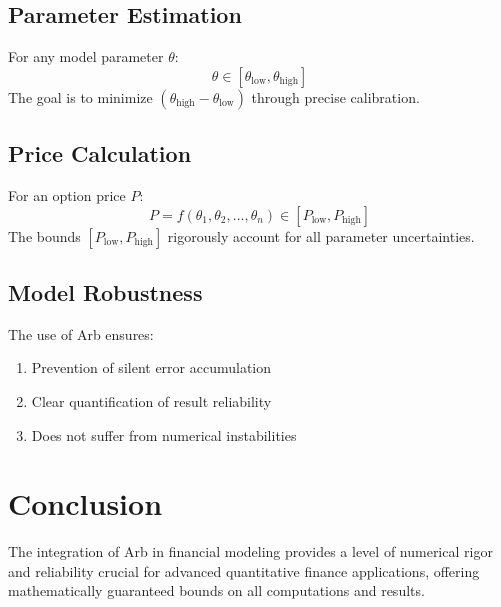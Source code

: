 \documentclass{article}
\newcommand{\tmop}[1]{\ensuremath{\operatorname{#1}}}
\begin{document}
\subsection{Parameter Estimation}

For any model parameter $\theta$:
\[ \theta \in [\theta_{\tmop{low}}, \theta_{\tmop{high}}] \]
The goal is to minimize $(\theta_{\tmop{high}} - \theta_{\tmop{low}})$ through
precise calibration.

\subsection{Price Calculation}

For an option price $P$:
\[ P = f (\theta_1, \theta_2, ..., \theta_n) \in [P_{\tmop{low}},
   P_{\tmop{high}}] \]
The bounds $[P_{\tmop{low}}, P_{\tmop{high}}]$ rigorously account for all
parameter uncertainties.

\subsection{Model Robustness}

The use of Arb ensures:
\begin{enumerate}
  \item Prevention of silent error accumulation
  
  \item Clear quantification of result reliability
  
  \item Does not suffer from numerical instabilities 
\end{enumerate}

\section{Conclusion}

The integration of Arb in financial modeling provides a level of numerical
rigor and reliability crucial for advanced quantitative finance applications,
offering mathematically guaranteed bounds on all computations and results.
\end{document}
